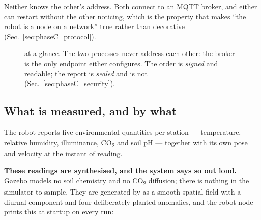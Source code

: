 Neither knows the other's address. Both connect to an MQTT broker, and
either can restart without the other noticing, which is the property
that makes ``the robot is a node on a network'' true rather than
decorative (Sec.~\ref{sec:phaseC_protocol}).

\begin{figure}[!t]
\centering
{}
\caption{\phaseC{} at a glance. The two processes never address each
other: the broker is the only endpoint either configures. The order is
\emph{signed} and readable; the report is \emph{sealed} and is not
(Sec.~\ref{sec:phaseC_security}).}
\label{fig:phaseC_arch}
\end{figure}

\subsection{What is measured, and by what}

The robot reports five environmental quantities per station ---
temperature, relative humidity, illuminance, CO\textsubscript{2} and
soil pH --- together with its own pose and velocity at the instant of
reading.

\textbf{These readings are synthesised, and the system says so out
loud.} Gazebo models no soil chemistry and no CO\textsubscript{2}
diffusion; there is nothing in the simulator to sample. They are
generated by  as a smooth spatial field with a
diurnal component and four deliberately planted anomalies, and the robot
node prints this at startup on every run:

